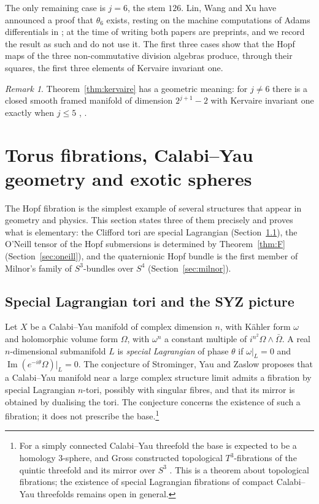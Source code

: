 \documentclass[11pt]{amsart}
\numberwithin{equation}{section}
\theoremstyle{plain}
\theoremstyle{definition}
\theoremstyle{remark}
\newtheorem{remark}[theorem]{Remark}
\newcommand{\Imag}{\operatorname{Im}}
\begin{document}
The only remaining case is $j=6$, the stem $126$. Lin, Wang and Xu \cite{LWX24} have announced a proof that $\theta_6$ exists, resting on the machine computations of Adams differentials in \cite{LWX24b}; at the time of writing both papers are preprints, and we record the result as such and do not use it. The first three cases show that the Hopf maps of the three non-commutative division algebras produce, through their squares, the first three elements of Kervaire invariant one.

\begin{remark}
Theorem~\ref{thm:kervaire} has a geometric meaning: for $j\neq6$ there is a closed smooth framed manifold of dimension $2^{j+1}-2$ with Kervaire invariant one exactly when $j\le5$ \cite{Bro69}, \cite{HHR16}.
\end{remark}
\section{Torus fibrations, Calabi--Yau geometry and exotic spheres}\label{ch:cy}

The Hopf fibration is the simplest example of several structures that appear in geometry and physics. This section states three of them precisely and proves what is elementary: the Clifford tori are special Lagrangian (Section~\ref{sec:syz}), the O'Neill tensor of the Hopf submersions is determined by Theorem~\ref{thm:F} (Section~\ref{sec:oneill}), and the quaternionic Hopf bundle is the first member of Milnor's family of $S^3$-bundles over $S^4$ (Section~\ref{sec:milnor}).

\subsection{Special Lagrangian tori and the SYZ picture}\label{sec:syz}

Let $X$ be a Calabi--Yau manifold of complex dimension $n$, with K\"ahler form $\omega$ and holomorphic volume form $\Omega$, with $\omega^n$ a constant multiple of $i^{n^2}\Omega\wedge\bar\Omega$. A real $n$-dimensional submanifold $L$ is \emph{special Lagrangian} of phase $\theta$ if $\omega|_L=0$ and $\Imag(e^{-i\theta}\Omega)|_L=0$. The conjecture of Strominger, Yau and Zaslow \cite{SYZ96} proposes that a Calabi--Yau manifold near a large complex structure limit admits a fibration by special Lagrangian $n$-tori, possibly with singular fibres, and that its mirror is obtained by dualising the tori. The conjecture concerns the existence of such a fibration; it does not prescribe the base.\footnote{For a simply connected Calabi--Yau threefold the base is expected to be a homology $3$-sphere, and Gross constructed topological $T^3$-fibrations of the quintic threefold and its mirror over $S^3$ \cite{Gro01}. This is a theorem about topological fibrations; the existence of special Lagrangian fibrations of compact Calabi--Yau threefolds remains open in general.}
\end{document}
